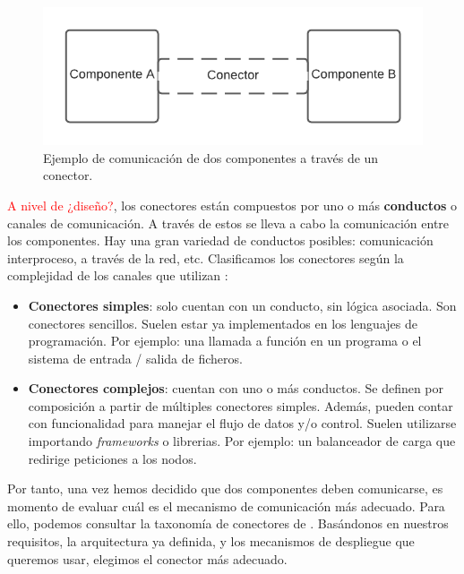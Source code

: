 
\begin{figure}[h!]
  \centering
  \includegraphics[scale=0.78]{02_arquitectura/images/conector}
  \caption{Ejemplo de comunicación de dos componentes a través de un conector.}
  \label{fig:componentesYConectorEjemplo}
\end{figure}

\textcolor{red}{A nivel de ¿diseño?}, los conectores están compuestos por uno o más \textbf{conductos} o canales de comunicación. A través de estos se lleva a cabo la comunicación entre los componentes. Hay una gran variedad de conductos posibles: comunicación interproceso, a través de la red, etc. Clasificamos los conectores según la complejidad de los canales que utilizan \cite{mehtaTaxonomySoftwareConnectors2000}:

\begin{itemize}
    \item \textbf{Conectores simples}: solo cuentan con un conducto, sin lógica asociada. Son conectores sencillos. Suelen estar ya implementados en los lenguajes de programación. Por ejemplo: una llamada a función en un programa o el sistema de entrada / salida de ficheros.

    \item \textbf{Conectores complejos}: cuentan con uno o más conductos. Se definen por composición a partir de múltiples conectores simples. Además, pueden contar con funcionalidad para manejar el flujo de datos y/o control. Suelen utilizarse importando \textit{frameworks} o librerias. Por ejemplo: un balanceador de carga que redirige peticiones a los nodos.
\end{itemize}

Por tanto, una vez hemos decidido que dos componentes deben comunicarse, es momento de evaluar cuál es el mecanismo de comunicación más adecuado. Para ello, podemos consultar la taxonomía de conectores de \cite{mehtaTaxonomySoftwareConnectors2000}. Basándonos en nuestros requisitos, la arquitectura ya definida, y los mecanismos de despliegue que queremos usar, elegimos el conector más adecuado.

